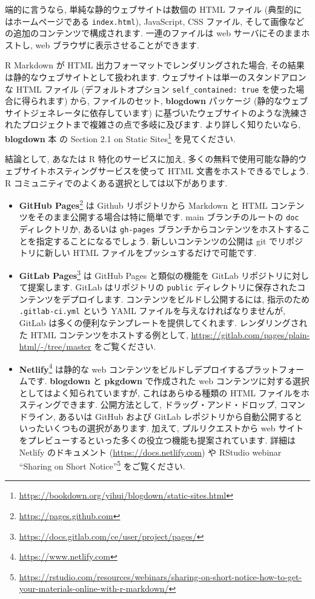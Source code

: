 \documentclass[
  11pt,
]{bxjsreport}
\renewcommand{\href}[2]{#2\footnote{\url{#1}}}
\begin{document}
端的に言うなら, 単純な静的ウェブサイトは数個の HTML ファイル (典型的にはホームページである \texttt{index.html}), JavaScript, CSS ファイル, そして画像などの追加のコンテンツで構成されます. 一連のファイルは web サーバにそのままホストし, web ブラウザに表示させることができます.

R Markdown が HTML 出力フォーマットでレンダリングされた場合, その結果は静的なウェブサイトとして扱われます. ウェブサイトは単一のスタンドアロンな HTML ファイル (デフォルトオプション \texttt{self\_contained: true} を使った場合に得られます) から, ファイルのセット, \textbf{blogdown} パッケージ (静的なウェブサイトジェネレータに依存しています) に基づいたウェブサイトのような洗練されたプロジェクトまで複雑さの点で多岐に及びます. より詳しく知りたいなら, \textbf{blogdown} 本 \autocite{blogdown2017} の \href{https://bookdown.org/yihui/blogdown/static-sites.html}{Section 2.1 on Static Sites} を見てください.

結論として, あなたは R 特化のサービスに加え, 多くの無料で使用可能な静的ウェブサイトホスティングサービスを使って HTML 文書をホストできるでしょう. R コミュニティでのよくある選択としては以下があります.

\begin{itemize}
\item
  \href{https://pages.github.com}{\textbf{GitHub Pages}} は Github リポジトリから Markdown と HTML コンテンツをそのまま公開する場合は特に簡単です. main ブランチのルートの \texttt{doc} ディレクトリか, あるいは \texttt{gh-pages} ブランチからコンテンツをホストすることを指定することになるでしょう. 新しいコンテンツの公開は git でリポジトリに新しい HTML ファイルをプッシュするだけで可能です.
\item
  \href{https://docs.gitlab.com/ce/user/project/pages/}{\textbf{GitLab Pages}} は GitHub Pages と類似の機能を GitLab リポジトリに対して提案します. GitLab はリポジトリの \texttt{public} ディレクトリに保存されたコンテンツをデプロイします. コンテンツをビルドし公開するには, 指示のため \texttt{.gitlab-ci.yml} という YAML ファイルを与えなければなりませんが, GitLab は多くの便利なテンプレートを提供してくれます. レンダリングされた HTML コンテンツをホストする例として, \url{https://gitlab.com/pages/plain-html/-/tree/master} をご覧ください.
\item
  \href{https://www.netlify.com}{\textbf{Netlify}} は静的な web コンテンツをビルドしデプロイするプラットフォームです. \textbf{blogdown} と \textbf{pkgdown} で作成された web コンテンツに対する選択としてはよく知られていますが, これはあらゆる種類の HTML ファイルをホスティングできます. 公開方法として, ドラッグ・アンド・ドロップ, コマンドライン, あるいは GitHub および GitLab レポジトリから自動公開するといったいくつもの選択があります. 加えて, プルリクエストから web サイトをプレビューするといった多くの役立つ機能も提案されています. 詳細は Netlify のドキュメント (\url{https://docs.netlify.com}) や RStudio webinar \href{https://rstudio.com/resources/webinars/sharing-on-short-notice-how-to-get-your-materials-online-with-r-markdown/}{``Sharing on Short Notice''} をご覧ください.
\end{itemize}
\end{document}
